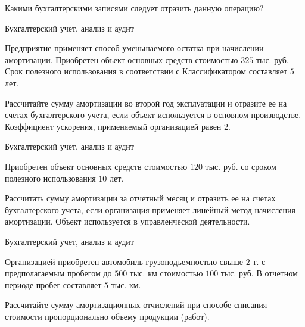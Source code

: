 \documentclass[
	11pt,
	a4paper,
	]
	{article}
\begin{document}
	Какими бухгалтерскими записями следует отразить данную операцию?

\begin{center}\lowGE * \end{center}
\newpage



 {Бухгалтерский учет, анализ и аудит}
\prGE

	Предприятие применяет способ уменьшаемого остатка при начислении амортизации. 
	Приобретен объект основных средств стоимостью $325$ тыс. руб. Срок полезного использования в соответствии с Классификатором составляет $5$ лет. 
	\medskip

	Рассчитайте сумму амортизации во второй год эксплуатации и отразите ее на счетах бухгалтерского учета, если объект используется в основном производстве. Коэффициент ускорения, применяемый организацией равен $2$.

\begin{center}\lowGE * \end{center}
\newpage




 {Бухгалтерский учет, анализ и аудит}
\prGE

	Приобретен объект основных средств стоимостью $120$ тыс. руб. со сроком полезного использования $10$ лет. \medskip

	Рассчитать сумму амортизации за отчетный месяц и отразить ее на счетах бухгалтерского учета, если организация применяет линейный метод начисления амортизации. Объект используется в управленческой деятельности.

\begin{center}\lowGE * \end{center}
\newpage



 {Бухгалтерский учет, анализ и аудит}
\prGE

	Организацией приобретен автомобиль грузоподъемностью свыше $2$ т. с предполагаемым пробегом до $500$ тыс. км стоимостью $100$ тыс. руб. В отчетном периоде пробег составляет $5$ тыс. км. 
	\medskip

	Рассчитайте сумму амортизационных отчислений при способе списания стоимости пропорционально объему продукции (работ).

\begin{center}\lowGE * \end{center}
\newpage
\end{document}
